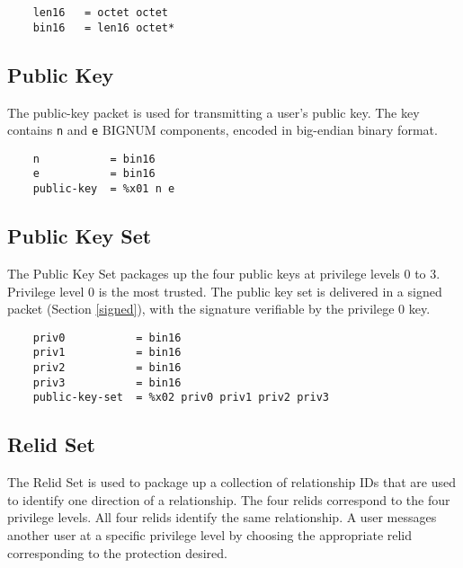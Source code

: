 \documentclass[letterpaper,11pt,oneside]{article}
\begin{document}
\vspace{10pt}
\begin{verbatim}
    len16   = octet octet
    bin16   = len16 octet*
\end{verbatim}
\vspace{10pt}

\subsection{Public Key}
\label{public-key-packet}

The public-key packet is used for transmitting a user's public key. The key
contains \verb|n| and \verb|e| BIGNUM components, encoded in big-endian binary
format. 

\vspace{10pt}
\begin{verbatim}
    n           = bin16
    e           = bin16
    public-key  = %x01 n e
\end{verbatim}
\vspace{10pt}

\subsection{Public Key Set}
\label{public-key-set}

The Public Key Set packages up the four public keys at privilege levels 0 to 3.
Privilege level 0 is the most trusted. The public key set is delivered in a
signed packet (Section \ref{signed}), with the signature verifiable by the
privilege 0 key.

\vspace{10pt}
\begin{verbatim}
    priv0           = bin16
    priv1           = bin16
    priv2           = bin16
    priv3           = bin16
    public-key-set  = %x02 priv0 priv1 priv2 priv3
\end{verbatim}
\vspace{10pt}

\subsection{Relid Set}

The Relid Set is used to package up a collection of relationship IDs that are
used to identify one direction of a relationship. The four relids correspond to
the four privilege levels. All four relids identify the same relationship. A
user messages another user at a specific privilege level by choosing the
appropriate relid corresponding to the protection desired.
\end{document}
